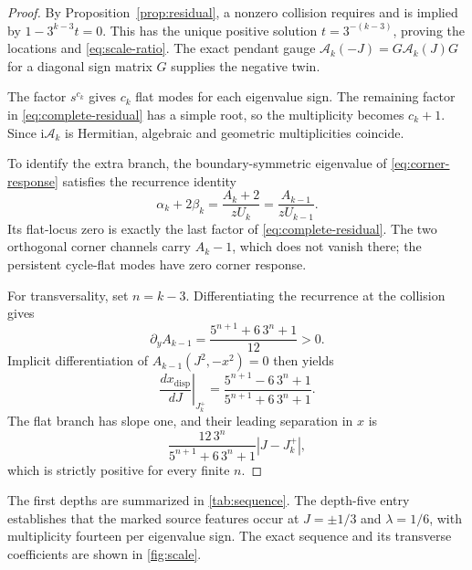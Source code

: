 \documentclass[11pt]{article}
\theoremstyle{remark}
\newcommand{\ii}{\mathrm{i}}
\newcommand{\Acal}{\mathcal{A}}
\begin{document}
\begin{proof}
By Proposition~\ref{prop:residual}, a nonzero collision requires and is implied by
$1-3^{k-3}t=0$.  This has the unique positive solution
$t=3^{-(k-3)}$, proving the locations and \cref{eq:scale-ratio}.  The exact
pendant gauge $\Acal_k(-J)=G\Acal_k(J)G$ for a diagonal sign matrix $G$
supplies the negative twin.

The factor $s^{c_k}$ gives $c_k$ flat modes for each eigenvalue sign.  The
remaining factor in \cref{eq:complete-residual} has a simple root, so the
multiplicity becomes $c_k+1$.  Since $\ii\Acal_k$ is Hermitian, algebraic and
geometric multiplicities coincide.

To identify the extra branch, the boundary-symmetric eigenvalue of
\cref{eq:corner-response} satisfies the recurrence identity
\begin{equation}
 \alpha_k+2\beta_k
 =\frac{A_k+2}{zU_k}
 =\frac{A_{k-1}}{zU_{k-1}}.
 \label{eq:symmetric-channel}
\end{equation}
Its flat-locus zero is exactly the last factor of
\cref{eq:complete-residual}.  The two orthogonal corner channels carry
$A_k-1$, which does not vanish there; the persistent cycle-flat modes have
zero corner response.

For transversality, set $n=k-3$.  Differentiating the recurrence at the
collision gives
\begin{equation}
 \partial_y A_{k-1}
 =\frac{5^{n+1}+6\,3^n+1}{12}>0.
 \label{eq:partial-y}
\end{equation}
Implicit differentiation of $A_{k-1}(J^2,-x^2)=0$ then yields
\begin{equation}
 \left.\frac{dx_{\mathrm{disp}}}{dJ}\right|_{J_k^+}
 =\frac{5^{n+1}-6\,3^n+1}{5^{n+1}+6\,3^n+1}.
 \label{eq:disp-slope}
\end{equation}
The flat branch has slope one, and their leading separation in $x$ is
\begin{equation}
 \frac{12\,3^n}{5^{n+1}+6\,3^n+1}|J-J_k^+|,
 \label{eq:linear-separation}
\end{equation}
which is strictly positive for every finite $n$.
\end{proof}

The first depths are summarized in \cref{tab:sequence}.  The depth-five
entry establishes that the marked source features occur at $J=\pm1/3$ and
$\lambda=1/6$, with multiplicity fourteen per eigenvalue sign.  The exact
sequence and its transverse coefficients are shown in \cref{fig:scale}.
\end{document}
